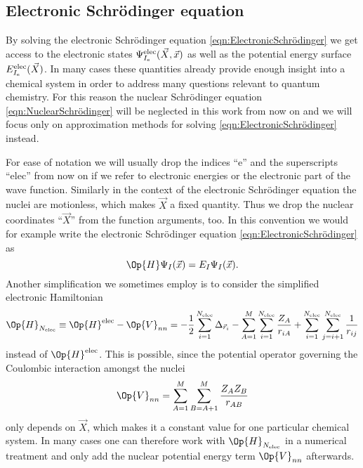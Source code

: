 \subsection{Electronic Schrödinger equation}
\label{sec:ElectronicSchrödinger}
By solving the electronic Schrödinger equation \eqref{eqn:ElectronicSchrödinger}
we get access to the electronic states $\Psi^\text{elec}_{I_\text{e}}(\vec{X}, \vec{x})$
as well as the potential energy surface $E^\text{elec}_{I_\text{e}}(\vec{X})$.
In many cases these quantities already provide
enough insight into a chemical system in order to address many
questions relevant to quantum chemistry.
For this reason the nuclear Schrödinger equation \eqref{eqn:NuclearSchrödinger}
will be neglected in this work from now on
and we will focus only
on approximation methods for solving \eqref{eqn:ElectronicSchrödinger} instead.

For ease of notation we will usually drop the indices ``e'' and the
superscripts ``elec'' from now on if we refer to electronic energies
or the electronic part of the wave function.
Similarly in the context of the electronic Schrödinger equation
the nuclei are motionless, which makes $\vec{X}$ a fixed quantity.
Thus we drop the nuclear coordinates ``$\vec{X}$''
from the function arguments, too.
In this convention we would for example
write the electronic Schrödinger equation \eqref{eqn:ElectronicSchrödinger} as
\[ \Op{H} \Psi_I(\vec{x}) = E_I \Psi_I(\vec{x}). \]
Another simplification we sometimes employ is to consider
the simplified electronic Hamiltonian
\begin{equation}
	\Op{H}_{\Nelec} \equiv \Op{H}^\text{elec} - \Op{V}_{nn}
	= -\frac12 \sum_{i=1}^{\Nelec} \Delta_{\vec{r}_i}
	- \sum_{A=1}^M \sum_{i=1}^{\Nelec} \frac{Z_A}{r_{iA}}
	+ \sum_{i=1}^{\Nelec} \sum_{j=i+1}^{\Nelec} \frac{1}{r_{ij}}
	\label{eqn:ElectronicHamiltonian}
\end{equation}
instead of $\Op{H}^\text{elec}$.
This is possible, since the potential operator governing the Coulombic interaction
amongst the nuclei
\[
	\Op{V}_{nn} = \sum_{A=1}^M \sum_{B=A+1}^M \frac{Z_A Z_B}{r_{AB}}
\]
only depends on $\vec{X}$, which makes it a constant value for one particular chemical system.
In many cases one can therefore work with $\Op{H}_{\Nelec}$
in a numerical treatment and only add the nuclear potential energy term $\Op{V}_{nn}$
afterwards.

